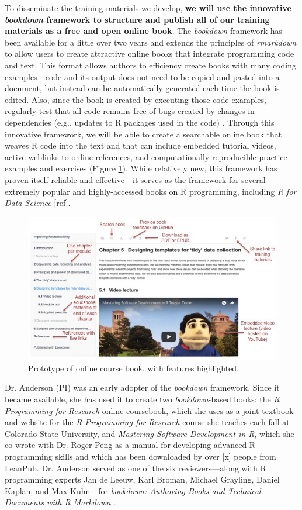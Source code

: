 \documentclass[pdftex,english,11pt,parskip=half]{scrartcl}
\begin{document}
To disseminate the training materials we develop, \textbf{we will use the innovative \textit{bookdown} framework \cite{xie2016bookdown} to structure and publish all of our training materials as a free and open online book}. The \textit{bookdown} framework has been available for a little over two years and extends the principles of \textit{rmarkdown} to allow users to create attractive online books that integrate programming code and text. This format allows authors to efficiency create books with many coding examples---code and its output does not need to be copied and pasted into a document, but instead can be automatically generated each time the book is edited. Also, since the book is created by executing those code examples, regularly test that all code remains free of bugs created by changes in dependencies (e.g., updates to R packages used in the code) \cite{xie2016bookdown}. Through this innovative framework, we will be able to create a searchable online book that weaves R code into the text and that can include embedded tutorial videos, active weblinks to online references, and computationally reproducible practice examples and exercises (Figure \ref{fig:prototype}). While relatively new, this framework has proven itself reliable and effective---it serves as the framework for several extremely popular and highly-accessed books on R programming, including \textit{R for Data Science} [ref]. 

\begin{figure}[t]
\includegraphics[width = \textwidth]{figures/book_prototype.jpg}
\caption{Prototype of online course book, with features highlighted.}
\label{fig:prototype}
\end{figure}

Dr. Anderson (PI) was an early adopter of the \textit{bookdown} framework. Since it became available, she has used it to create two \textit{bookdown}-based books: the \textit{R Programming for Research} online coursebook, which she uses as a joint textbook and website for the \textit{R Programming for Research} course she teaches each fall at Colorado State University, and \textit{Mastering Software Development in R}, which she co-wrote with Dr. Roger Peng as a manual for developing advanced R programming skills and which has been downloaded by over [x] people from LeanPub. Dr. Anderson served as one of the six reviewers---along with R programming experts Jan de Leeuw, Karl Broman, Michael Grayling, Daniel Kaplan, and Max Kuhn---for \textit{bookdown: Authoring Books and Technical Documents with R Markdown} \cite{xie2016bookdown}.
\end{document}
